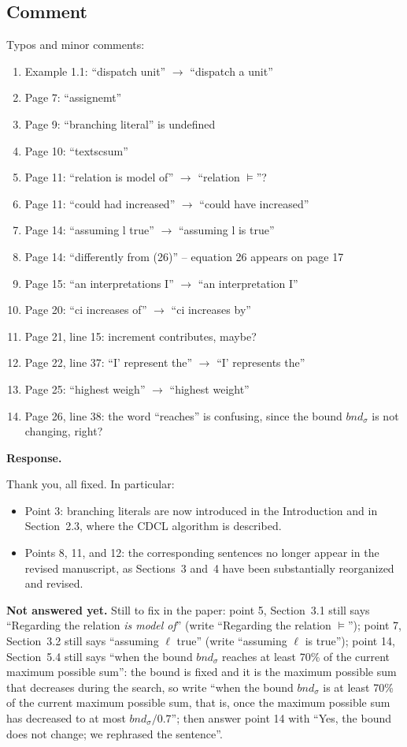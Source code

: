 \documentclass[11pt]{article}
\newcommand{\bnd}{\mathit{bnd}}
\theoremstyle{definition}
\newcommand{\revieweranswered}{\subsection{Comment}}
\newenvironment{response}{
    \color{blue} \textbf{Response.}
}{
}
\newcommand{\notanswered}[1]{{\color{red}\textbf{Not answered yet.} #1}}
\begin{document}
\vspace{0.5cm}
\revieweranswered
Typos and minor comments:
\begin{enumerate}
    \item Example 1.1: ``dispatch unit'' $\rightarrow$ ``dispatch a unit''
    \item Page 7: ``assignemt''
    \item Page 9: ``branching literal'' is undefined
    \item Page 10: ``textscsum''
    \item Page 11: ``relation is model of'' $\rightarrow$ ``relation $\models$''?
    \item Page 11: ``could had increased'' $\rightarrow$ ``could have increased''
    \item Page 14: ``assuming l true'' $\rightarrow$ ``assuming l is true''
    \item Page 14: ``differently from (26)'' -- equation 26 appears on page 17
    \item Page 15: ``an interpretations I'' $\rightarrow$ ``an interpretation I''
    \item Page 20: ``ci increases of'' $\rightarrow$ ``ci increases by''
    \item Page 21, line 15: increment contributes, maybe?
    \item Page 22, line 37: ``I' represent the'' $\rightarrow$ ``I' represents the''
    \item Page 25: ``highest weigh'' $\rightarrow$ ``highest weight''
    \item Page 26, line 38: the word ``reaches'' is confusing, since the bound $\bnd_\sigma$ is not changing, right?
\end{enumerate}

\begin{response}
    Thank you, all fixed. In particular:
    \begin{itemize}
        \item Point 3: branching literals are now introduced in the Introduction and in Section~2.3, where the CDCL algorithm is described.
        \item Points 8, 11, and 12: the corresponding sentences no longer appear in the revised manuscript, as Sections~3 and~4 have been substantially reorganized and revised.
    \end{itemize}
    \notanswered{Still to fix in the paper:
    point 5, Section~3.1 still says ``Regarding the relation \emph{is model of}'' (write ``Regarding the relation $\models$'');
    point 7, Section~3.2 still says ``assuming $\ell$ true'' (write ``assuming $\ell$ is true'');
    point 14, Section~5.4 still says ``when the bound $\bnd_\sigma$ reaches at least 70\% of the current maximum possible sum'': the bound is fixed and it is the maximum possible sum that decreases during the search, so write ``when the bound $\bnd_\sigma$ is at least 70\% of the current maximum possible sum, that is, once the maximum possible sum has decreased to at most $\bnd_\sigma / 0.7$''; then answer point 14 with ``Yes, the bound does not change; we rephrased the sentence''.}
\end{response}
\end{document}
